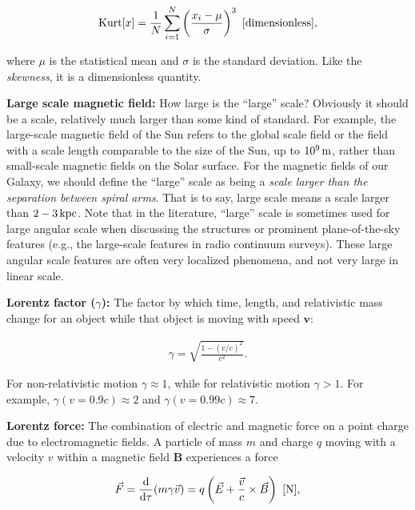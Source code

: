 \documentclass[a4paper,10pt]{article}
\begin{document}
\begin{align*}
    {\rm Kurt}[x] = \frac{1}{N} \sum_{i=1}^N \left(\frac{x_i-\mu}{\sigma}\right)^3 ~ [{\rm dimensionless}],
\end{align*}

{\noindent}where $\mu$ is the statistical mean and $\sigma$ is the standard deviation. Like the \textit{skewness}, it is a dimensionless quantity.

{\noindent}\textbf{Large scale magnetic field:} How large is the ``large'' scale? Obviously it should be a scale, relatively much larger than some kind of standard. For example, the large-scale magnetic field of the Sun refers to the global scale field or the field with a scale length comparable to the size of the Sun, up to $10^9\,{\rm m}$, rather than small-scale magnetic fields on the Solar surface. For the magnetic fields of our Galaxy, we should define the ``large'' scale as being a \textit{scale larger than the separation between spiral arms}. That is to say, large scale means a scale larger than $2-3\,{\rm kpc}$. Note that in the literature, ``large'' scale is sometimes used for large angular scale when discussing the structures or prominent plane-of-the-sky features (e.g., the large-scale features in radio continuum surveys). These large angular scale features are often very localized phenomena, and not very large in linear scale.

{\noindent}\textbf{Lorentz factor ($\gamma$):} The factor by which time, length, and relativistic mass change for an object while that object is moving with speed $\mathbf{v}$:

\begin{align*}
    \gamma = \sqrt{\frac{1-(v/c)^2}{c^2}}.
\end{align*}

{\noindent}For non-relativistic motion $\gamma\approx1$, while for relativistic motion $\gamma>1$. For example, $\gamma(v=0.9c)\approx2$ and $\gamma(v=0.99c)\approx7$.

{\noindent}\textbf{Lorentz force:} The combination of electric and magnetic force on a point charge due to electromagnetic fields. A particle of mass $m$ and charge $q$ moving with a velocity $v$ within a magnetic field $\mathbf{B}$ experiences a force 

\begin{align*}
    \vec{F} = \dfrac{\mathrm{d}}{\mathrm{d}\tau} (m\gamma\vec{v}) = q\left(\vec{E} + \dfrac{\vec{v}}{c}\times\vec{B}\right) ~ [{\rm N}],
\end{align*}
\end{document}

